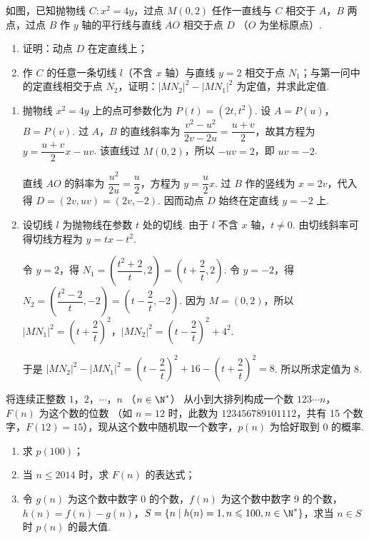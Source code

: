 \begin{problem}
如图，已知抛物线 \(C: x^2 = 4y\)，过点 \(M(0,2)\) 任作一直线与 \(C\) 相交于 \(A\)，\(B\) 两点，过点 \(B\) 作 \(y\) 轴的平行线与直线 \(AO\) 相交于点 \(D\) （\(O\) 为坐标原点）.
\begin{enumerate}
\item 证明：动点 \(D\) 在定直线上；
\item 作 \(C\) 的任意一条切线 \(l\)（不含 \(x\) 轴）与直线 \(y = 2\) 相交于点 \(N_{1}\)；与第一问中的定直线相交于点 \(N_{2}\)，证明：\(|MN_{2}|^{2} - |MN_{1}|^{2}\) 为定值，并求此定值.
\end{enumerate}
\end{problem}

\begin{solution}
\begin{enumerate}
\item 抛物线 \(x^2=4y\) 上的点可参数化为 \(P(t)=(2t,t^2)\). 设 \(A=P(u)\)，\(B=P(v)\). 过 \(A\)，\(B\) 的直线斜率为
\(\dfrac{v^2-u^2}{2v-2u}=\dfrac{u+v}{2}\)，故其方程为 \(y=\dfrac{u+v}{2}x-uv\). 该直线过 \(M(0,2)\)，所以 \(-uv=2\)，即 \(uv=-2\).

直线 \(AO\) 的斜率为 \(\dfrac{u^2}{2u}=\dfrac u2\)，方程为 \(y=\dfrac u2x\). 过 \(B\) 作的竖线为 \(x=2v\)，代入得 \(D=(2v,uv)=(2v,-2)\). 因而动点 \(D\) 始终在定直线 \(y=-2\) 上.
\item 设切线 \(l\) 为抛物线在参数 \(t\) 处的切线. 由于 \(l\) 不含 \(x\) 轴，\(t\ne0\). 由切线斜率可得切线方程为 \(y=tx-t^2\).

令 \(y=2\)，得 \(N_1=\left(\dfrac{t^2+2}{t},2\right)=\left(t+\dfrac2t,2\right)\). 令 \(y=-2\)，得 \(N_2=\left(\dfrac{t^2-2}{t},-2\right)=\left(t-\dfrac2t,-2\right)\). 因为 \(M=(0,2)\)，所以
\(|MN_1|^2=\left(t+\dfrac2t\right)^2\)，\(|MN_2|^2=\left(t-\dfrac2t\right)^2+4^2\).

于是
\(|MN_2|^2-|MN_1|^2=\left(t-\dfrac2t\right)^2+16-\left(t+\dfrac2t\right)^2=8\). 所以所求定值为 8.
\end{enumerate}
\end{solution}

\begin{problem}
将连续正整数 \(1\)，\(2\)，\(\cdots\)，\(n\) （\(n \in \N^*\)） 从小到大排列构成一个数 \(123\cdots n\)，\(F(n)\) 为这个数的位数 （如 \(n = 12\) 时，此数为 \(123456789101112\)，共有 15 个数字，\(F(12) = 15\)），现从这个数中随机取一个数字，\(p(n)\) 为恰好取到 0 的概率.
\begin{enumerate}
\item 求 \(p(100)\)；
\item 当 \(n \leqslant 2014\) 时，求 \(F(n)\) 的表达式；
\item 令 \(g(n)\) 为这个数中数字 0 的个数，\(f(n)\) 为这个数中数字 9 的个数，\(h(n) = f(n) - g(n)\)，\(S = \{n \mid h(n) = 1, n \leqslant 100, n \in \N^*\}\)，求当 \(n \in S\) 时 \(p(n)\) 的最大值.
\end{enumerate}
\end{problem}

